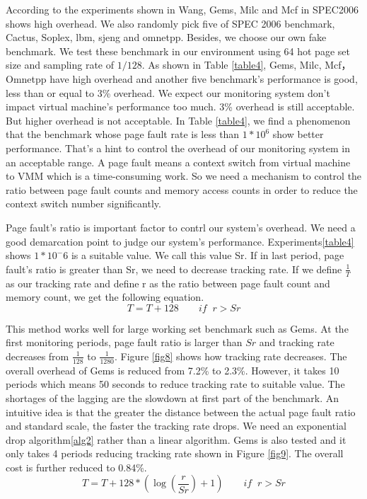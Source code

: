 \documentclass[10pt,twocolumn]{article}
\begin{document}
According to the experiments shown in Wang\cite{Wang2016Dynamic}, Gems, Milc and Mcf in SPEC2006 shows high overhead. We also randomly pick five of SPEC 2006 benchmark, Cactus, Soplex, lbm, sjeng and omnetpp. Besides, we choose our own fake benchmark. We test these benchmark in our environment using 64 hot page set size and sampling rate of $1/128$. As shown in Table \ref{table4}, Gems, Milc, Mcf， Omnetpp have high overhead and another five benchmark's performance is good, less than or equal to 3\% overhead. We expect our monitoring system don't impact virtual machine's performance too much. 3\% overhead is still acceptable. But higher overhead is not acceptable. In Table \ref{table4}, we find a phenomenon that the benchmark whose page fault rate is less than $1*10^6$ show better performance. That's a hint to control the overhead of our monitoring system in an acceptable range. A page fault means a context switch from virtual machine to VMM which is a time-consuming work. So we need a mechanism to control the ratio between page fault counts and memory access counts in order to reduce the context switch number significantly.

Page fault's ratio is important factor to contrl our system's overhead. We need a good demarcation point to judge our system's performance. Experiments\ref{table4} shows $1*10^-6$ is a suitable value. We call this value Sr. If in last period, page fault's ratio is greater than Sr, we need to decrease tracking rate. If we define $\frac{1}{T}$ as our tracking rate and define r as the ratio between page fault count and memory count, we get the following equation.
\begin{equation}
T = T + 128 \qquad if\;\; r>Sr
\end{equation}

This method works well for large working set benchmark such as Gems. At the first monitoring periods, page fault ratio is larger than $Sr$ and tracking rate decreases from $\frac{1}{128}$ to $\frac{1}{1280}$. Figure \ref{fig8} shows how tracking rate decreases. The overall overhead of Gems is reduced from 7.2\% to 2.3\%. However, it takes 10 periods which means 50 seconds to reduce tracking rate to suitable value. The shortages of the lagging are the slowdown at first part of the benchmark. An intuitive idea is that the greater the distance between the actual page fault ratio and standard scale, the faster the tracking rate drops. We need an exponential drop algorithm\ref{alg2} rather than a linear algorithm. Gems is also tested and it only takes 4 periods reducing tracking rate shown in Figure \ref{fig9}. The overall cost is further reduced to 0.84\%.
\begin{equation}
T = T + 128 * (\log(\frac{r}{Sr}) + 1) \qquad if\;\; r>Sr
\end{equation}
\label{alg2}
\end{document}
